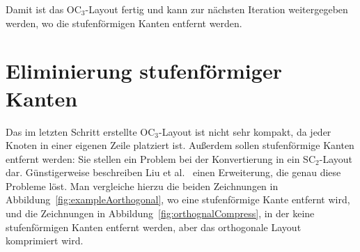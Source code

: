 \documentclass[a4paper]{scrreprt}
\theoremstyle{definition}
\begin{document}
Damit ist das OC$_3$-Layout fertig und kann zur nächsten Iteration weitergegeben werden, wo die stufenförmigen Kanten entfernt werden.


\section{Eliminierung stufenförmiger Kanten}

Das im letzten Schritt erstellte OC$_3$-Layout ist nicht sehr kompakt, da jeder Knoten in einer eigenen Zeile platziert ist. Außerdem sollen stufenförmige Kanten entfernt werden: Sie stellen ein Problem bei der Konvertierung in ein SC$_2$-Layout dar. Günstigerweise beschreiben Liu et al.~\cite{liu+etal-98} einen Erweiterung, die genau diese Probleme löst. Man vergleiche hierzu die beiden Zeichnungen in Abbildung~\ref{fig:exampleAorthogonal}, wo eine stufenförmige Kante entfernt wird, und die Zeichnungen in Abbildung~\ref{fig:orthognalCompress}, in der keine stufenförmigen Kanten entfernt werden, aber das orthogonale Layout komprimiert wird.
\end{document}
